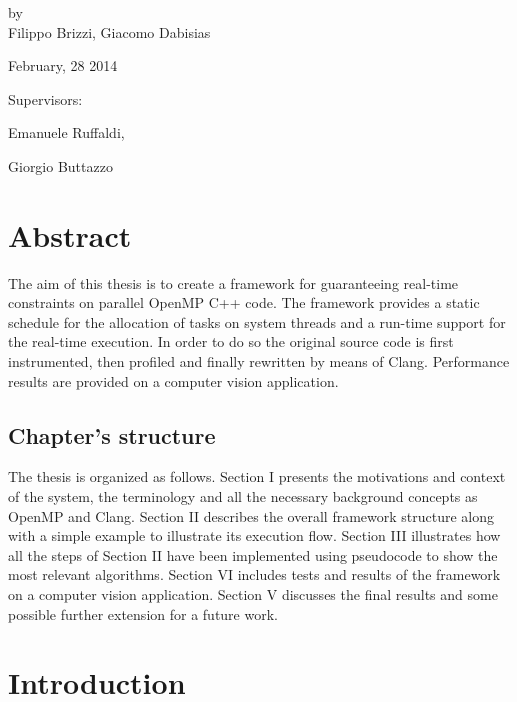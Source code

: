 \documentclass[a4paper,12pt,oneside]{book}
\begin{document}
\begin{titlepage}
\begin{center}
\begin{center}
\Large
by \\
Filippo Brizzi, Giacomo Dabisias
\end{center}

\Large{February, 28 2014}

\end{center}
\vspace{1.5cm}
\Large{
Supervisors:

Emanuele Ruffaldi,

Giorgio Buttazzo}


\end{titlepage}

\newpage
\thispagestyle{empty}
\mbox{}


\frontmatter


\chapter*{Abstract}

The aim of this thesis is to create a framework for guaranteeing real-time constraints on parallel OpenMP C++ code. The framework provides a static schedule for the allocation of tasks on system threads and a run-time support for the real-time execution. In order to do so the original source code is first instrumented, then profiled and finally rewritten by means of Clang. Performance results are provided on a computer vision application.

\section*{Chapter's structure}

The thesis is organized as follows. Section I presents the motivations and context of the system, the terminology and all the necessary background concepts as OpenMP and Clang. Section II describes the overall framework structure along with a simple example to illustrate its execution flow. Section III illustrates how all the steps of Section II have been implemented using pseudocode to show the most relevant algorithms. Section VI includes tests and results of the framework on a computer vision application. Section V discusses the final results and some possible further extension for a future work.

\tableofcontents
\mainmatter
\chapter{Introduction}
\end{document}
